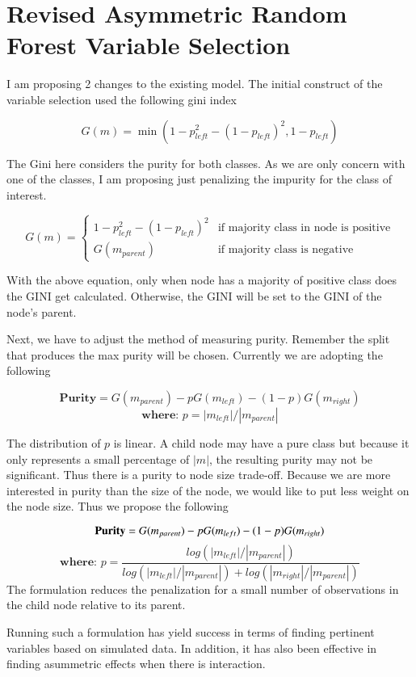 \documentclass[12pt]{report}
\begin{document}
\section{Revised Asymmetric Random Forest Variable Selection}
I am proposing 2 changes to the existing model. The initial construct of the variable selection used the following gini index

\begin{equation}\label{eqn:asymmetricginiindex}
	G(m)=\min(1-p_{left}^2-(1-p_{left})^2, 1-p_{left})
\end{equation}

The Gini here considers the purity for both classes. As we are only concern with one of the classes, I am proposing just penalizing the impurity for the class of interest. 


\begin{equation}\label{Eq:asymmetricginiindex2}
G(m)=
\begin{cases} 1-p_{left}^2-(1-p_{left})^2 & \text{if majority class in node is positive}
\\ G(m_{parent})&\text{if majority class is negative}
\end{cases}
\end{equation}

With the above equation, only when node has a majority of positive class does the GINI get calculated. Otherwise, the GINI will be set to the GINI of the node's parent.

Next, we have to adjust the method of measuring purity. Remember the split that produces the max purity will be chosen. Currently we are adopting the following

\[
	\textbf{Purity}=G(m_{parent})-pG(m_{left})-(1-p)G(m_{right})
\]
\[
	\textbf{where: } p = |m_{left}|/|m_{parent}|
\]

The distribution of $p$ is linear. A child node may have a pure class but because it only represents a small percentage of $|m|$, the resulting purity may not be significant. Thus there is a purity to node size trade-off. Because we are more interested in purity than the size of the node, we would like to put less weight on the node size. Thus we propose the following

\[
	\textbf{Purity}=G(m_{parent})-pG(m_{left})-(1-p)G(m_{right})\\
\]
\[
\textbf{where: } p = \frac{log(|m_{left}|/|m_{parent}|)}{log(|m_{left}|/|m_{parent}|) +log(|m_{right}|/|m_{parent}|)}
\]
The formulation reduces the penalization for a small number of observations in the child node relative to its parent.

Running such a formulation has yield success in terms of finding pertinent variables based on simulated data. In addition, it has also been effective in finding asummetric effects when there is interaction.
\end{document}
